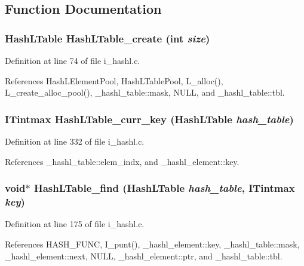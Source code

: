 \subsection{Function Documentation}
\subsubsection{\setlength{\rightskip}{0pt plus 5cm}\bf{Hash\-LTable} Hash\-LTable\_\-create (int {\em size})}\label{i__hashl_8h_6db31e96a7d097b016178159f9cb6dd8}




Definition at line 74 of file i\_\-hashl.c.

References Hash\-LElement\-Pool, Hash\-LTable\-Pool, L\_\-alloc(), L\_\-create\_\-alloc\_\-pool(), \_\-hashl\_\-table::mask, NULL, and \_\-hashl\_\-table::tbl.
\subsubsection{\setlength{\rightskip}{0pt plus 5cm}\bf{ITintmax} Hash\-LTable\_\-curr\_\-key (\bf{Hash\-LTable} {\em hash\_\-table})}\label{i__hashl_8h_d15fc1f7ab04c4a782bc632cd2968fef}




Definition at line 332 of file i\_\-hashl.c.

References \_\-hashl\_\-table::elem\_\-indx, and \_\-hashl\_\-element::key.
\subsubsection{\setlength{\rightskip}{0pt plus 5cm}void$\ast$ Hash\-LTable\_\-find (\bf{Hash\-LTable} {\em hash\_\-table}, \bf{ITintmax} {\em key})}\label{i__hashl_8h_009e4568177797fedf8b062c5b303c7d}




Definition at line 175 of file i\_\-hashl.c.

References HASH\_\-FUNC, I\_\-punt(), \_\-hashl\_\-element::key, \_\-hashl\_\-table::mask, \_\-hashl\_\-element::next, NULL, \_\-hashl\_\-element::ptr, and \_\-hashl\_\-table::tbl.
